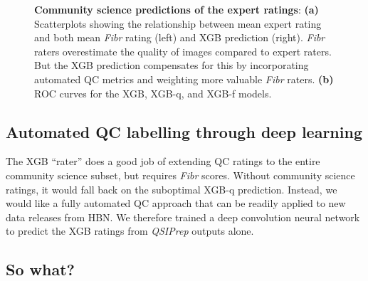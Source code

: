 \documentclass[fleqn,10pt]{wlscirep}
\begin{document}
\begin{figure}[ht]
    \begin{subfigure}{.5\textwidth}
    \centering
    \caption{}
    \label{fig:fibr-qc:scatter}
    \end{subfigure}
    \begin{subfigure}{.5\textwidth}
    \centering
    \caption{}
    \label{fig:fibr-qc:roc}
    \end{subfigure}
    \caption{%
        {\bf Community science predictions of the expert ratings}:
        \textbf{(a)} Scatterplots showing the relationship between mean expert
        rating and both mean \emph{Fibr} rating (left) and XGB prediction
        (right). \emph{Fibr} raters overestimate the quality of images compared
        to expert raters. But the XGB prediction compensates for this by
        incorporating automated QC metrics and weighting more valuable
        \emph{Fibr} raters.
        \textbf{(b)} ROC curves for the XGB, XGB-q, and XGB-f models.
    }
    \label{fig:fibr-qc}
\end{figure}

\subsection*{Automated QC labelling through deep learning}

The XGB ``rater'' does a good job of extending QC ratings to the entire
community science subset, but requires \emph{Fibr} scores. Without community
science ratings, it would fall back on the suboptimal XGB-q prediction. Instead,
we would like a fully automated QC approach that can be readily applied to new
data releases from HBN. We therefore trained a deep convolution neural network
to predict the XGB ratings from \emph{QSIPrep} outputs alone.


\subsection*{So what?}

\end{document}
